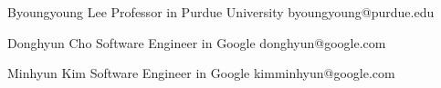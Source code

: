 

\begin{cvhonors}

  \cvhonor
    {Byoungyoung Lee} %
    {Professor in Purdue University} %
    {byoungyoung@purdue.edu} %
    {} %

  \cvhonor
    {Donghyun Cho} %
    {Software Engineer in Google} %
    {donghyun@google.com} %
    {} %

  \cvhonor
    {Minhyun Kim} %
    {Software Engineer in Google} %
    {kimminhyun@google.com} %
    {} %

\end{cvhonors}
